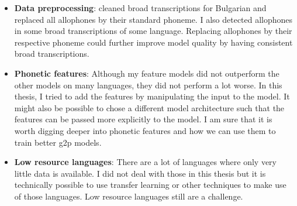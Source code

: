 \begin{itemize}
\item \textbf{Data preprocessing}: \cite{Ashby-Bartley.2021} cleaned broad transcriptions for Bulgarian and replaced all allophones by their standard phoneme. I also detected allophones in some broad transcriptions of some language. Replacing allophones by their respective phoneme could further improve model quality by having consistent broad transcriptions.
\item \textbf{Phonetic features}: Although my feature models did not outperform the other models on many languages, they did not perform a lot worse. In this thesis, I tried to add the features by manipulating the input to the model. It might also be possible to chose a different model architecture such that the features can be passed more explicitly to the model. I am sure that it is worth digging deeper into phonetic features and how we can use them to train better \ac{g2p} models.
\item \textbf{Low resource languages}: There are a lot of languages where only very little data is available. I did not deal with those in this thesis but it is technically possible to use transfer learning or other techniques to make use of those languages. Low resource languages still are a challenge.
\end{itemize}